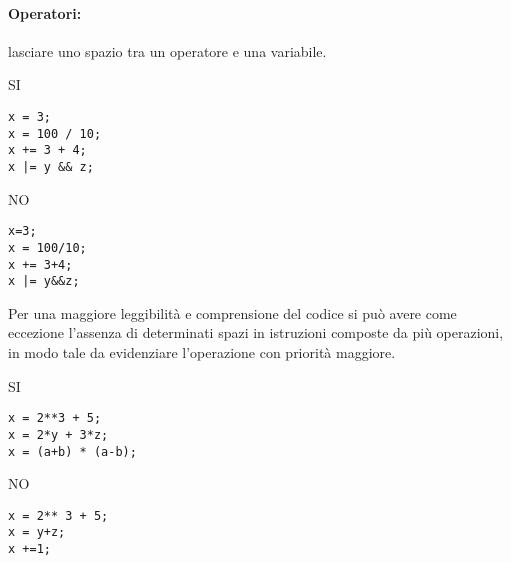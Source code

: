 \documentclass[../ProcessiPrimari.tex]{subfiles}
\begin{document}
\paragraph*{Operatori: }
lasciare uno spazio tra un operatore e una variabile.
\begin{center}{
\begin{minipage}{5cm}
{\begin{center}SI\end{center}}
\begin{Verbatim}[frame=single]
x = 3;
x = 100 / 10;
x += 3 + 4;
x |= y && z;
\end{Verbatim}
\end{minipage}
\hfil
\begin{minipage}{5cm}
{\begin{center}NO\end{center}}
\begin{Verbatim}[frame=single]
x=3;
x = 100/10;
x += 3+4;
x |= y&&z;
\end{Verbatim}
\end{minipage}
}
\end{center}
Per una maggiore leggibilità e comprensione del codice si può avere come eccezione l'assenza di determinati spazi in istruzioni composte da più operazioni, in modo tale da evidenziare l'operazione con priorità maggiore.
\begin{center}{
\begin{minipage}{5cm}
{\begin{center}SI\end{center}}
\begin{Verbatim}[frame=single]
x = 2**3 + 5;
x = 2*y + 3*z;
x = (a+b) * (a-b);
\end{Verbatim}
\end{minipage}
\hfil
\begin{minipage}{5cm}
{\begin{center}NO\end{center}}
\begin{Verbatim}[frame=single]
x = 2** 3 + 5;
x = y+z;
x +=1;
\end{Verbatim}
\end{minipage}
}
\end{center}
\end{document}
